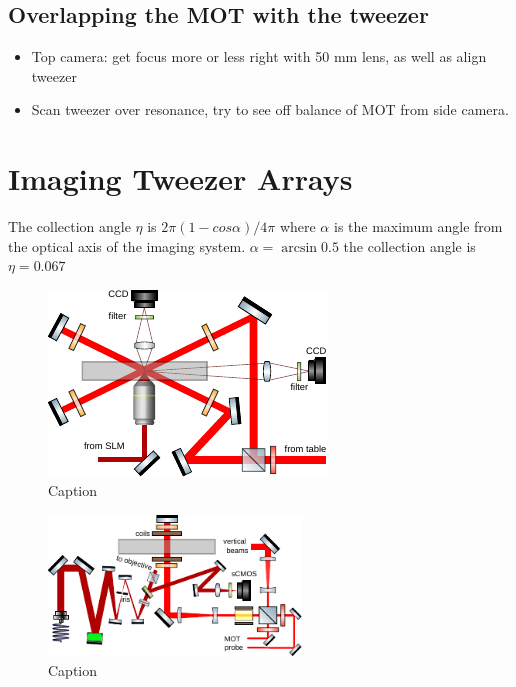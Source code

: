 \subsection{Overlapping the MOT with the tweezer}

\begin{itemize}
    \item Top camera: get focus more or less right with 50 mm lens, as well as align tweezer
    \item Scan tweezer over resonance, try to see off balance of MOT from side camera. 
\end{itemize}

\section{Imaging Tweezer Arrays}\label{sec:TweezerImaging}

The collection angle $\eta$ is $2\pi(1-cos{\alpha})/4\pi$ where $\alpha$ is the maximum angle from the optical axis of the imaging system. $\alpha=\arcsin{0.5}$ the collection angle is $\eta = 0.067$

\begin{figure}
    \centering
    \includegraphics[width=\textwidth]{figures/MOTsideview.pdf}
    \caption{Caption}
    \label{fig:my_label}
\end{figure}

\begin{figure}
    \centering
    \includegraphics[width=0.6\textwidth]{figures/MOTupview.pdf}
    \caption{Caption}
    \label{fig:my_label}
\end{figure}


